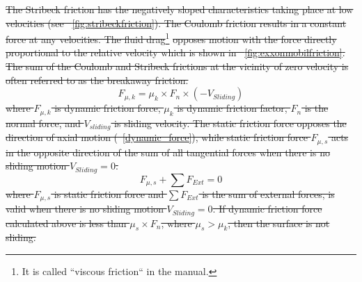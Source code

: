 \sout{
The Stribeck friction has the negatively sloped characteristics taking place at low velocities (see \figurename~\ref{fig:stribeckfriction}). The Coulomb friction results in a constant force at any velocities. The fluid drag}\footnote{It is called ``viscous friction`` in the manual.}\sout{ opposes motion with the force directly proportional to the relative velocity which is shown in \figurename~\ref{fig:exxonmobilfriction}. The sum of the Coulomb and Stribeck frictions at the vicinity of zero velocity is often referred to as the breakaway friction.}
\begin{equation}\label{dynamic_force}
  F_{\mu,k} = \mu_{k}\times F_{n} \times (-V_{Sliding})
\end{equation}
\sout{
where $F_{\mu,k}$ is dynamic friction force, $\mu_k$ is dynamic friction factor, $F_n$ is the normal force, and $V_{sliding}$ is sliding velocity.
The static friction force opposes the direction of axial motion (\equationname~\ref{dynamic_force}), while static friction force $F_{\mu,s}$ acts in the opposite direction of the sum of all tangential forces when there is no sliding motion $V_{Sliding}=0$.}
\begin{equation}\label{zero}
  F_{\mu,s} + \sum F_{Ext} = 0
\end{equation}
\sout{
where $F_{\mu,s}$ is static friction force and $\sum F_{Ext}$ is the sum of external forces, is valid when there is no sliding motion $V_{Sliding}=0$.
If dynamic friction force calculated above is less than $\mu_{s}\times F_{n}$, where $\mu_{s} > \mu_{k}$, then the surface is not sliding.}

